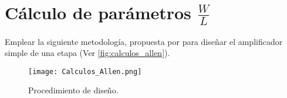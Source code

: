 \section{Cálculo de parámetros $\frac{W}{L}$ \label{sec:s1}}

\begin{center}
	\begin{minipage}{12cm}
		\begin{tcolorbox}[title=Actividad 1]
			Emplear la siguiente metodología, propuesta por \cite{Allen_2012} para diseñar el amplificador simple de una etapa (Ver \autoref{fig:calculos_allen}).
		\end{tcolorbox}	
	\end{minipage}
\end{center}

\begin{figure}[H]
	\centering
	\texttt{[image: Calculos\_Allen.png]}
	\caption{Procedimiento de diseño. \label{fig:calculos_allen}}
\end{figure}

